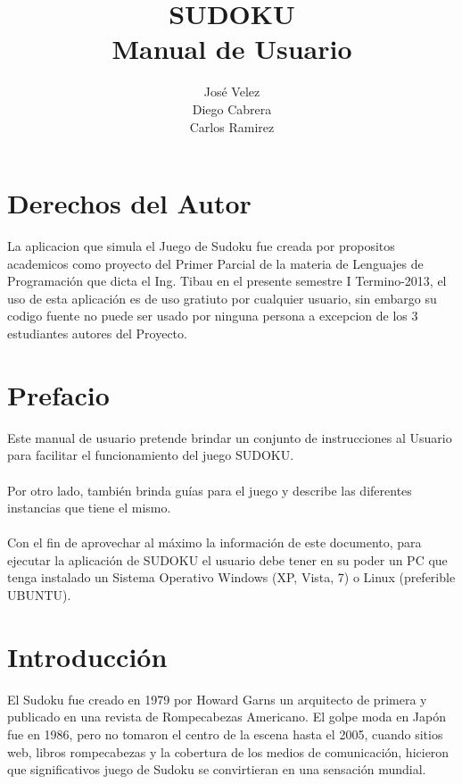 \documentclass[12pt,oneside]{book}
\title{SUDOKU \\ Manual de Usuario}
\author{José Velez \\ Diego Cabrera \\ Carlos Ramirez}
\begin{document}
\maketitle
\tableofcontents

\chapter{Derechos del Autor}
La aplicacion que simula el Juego de Sudoku fue creada por propositos academicos como proyecto del Primer Parcial de la materia de Lenguajes de Programación que dicta el Ing. Tibau en el presente semestre I Termino-2013, el uso de esta aplicación es de uso gratiuto por cualquier usuario, sin embargo su codigo fuente no puede ser usado por ninguna persona a excepcion de los 3 estudiantes autores del Proyecto.

\chapter{Prefacio}

Este manual de usuario pretende brindar un conjunto de instrucciones al Usuario para facilitar el funcionamiento del juego SUDOKU. \ \\ \\ 
Por otro lado, también brinda guías para el juego y describe las diferentes instancias que tiene el mismo. \ \\ \\
Con el fin de aprovechar al máximo la información de este documento, para ejecutar la aplicación de SUDOKU el usuario debe tener en su poder un PC que tenga instalado un Sistema Operativo Windows (XP, Vista, 7) o Linux (preferible UBUNTU).

\chapter{Introducción}

El Sudoku  fue creado en 1979 por Howard Garns un arquitecto de primera y publicado en una revista de Rompecabezas Americano. El golpe moda en Japón fue en 1986, pero no tomaron el centro de la escena hasta el 2005, cuando sitios web, libros rompecabezas y la cobertura de los medios de comunicación, hicieron que  significativos juego de Sudoku se convirtieran en una sensación mundial.
\end{document}
